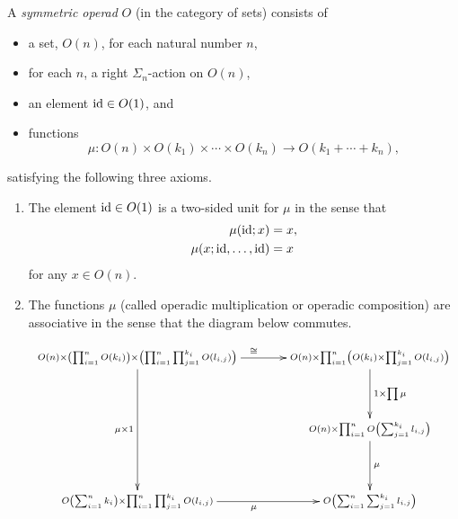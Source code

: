 \begin{Defi}
A \textit{symmetric operad} $O$ (in the category of sets) consists of
\begin{itemize}
\item a set, $O(n)$, for each natural number $n$,
\item for each $n$, a right $\Sigma_{n}$-action on $O(n)$,
\item an element $\textrm{id} \in O(1)$, and
\item functions
  \[
    \mu \colon  O(n) \times O(k_{1}) \times \cdots \times O(k_{n}) \rightarrow O(k_{1} + \cdots + k_{n}),
  \]
\end{itemize}
satisfying the following three axioms.
\begin{enumerate}
\item The element $\textrm{id} \in O(1)$ is a two-sided unit for $\mu$ in the sense that
  \begin{align*}
    \mu(\textrm{id};x) &= x,\\
    \mu(x;\textrm{id},\ldots,\textrm{id}) &= x
  \end{align*}
for any $x \in O(n)$.
\item The functions $\mu$ (called operadic multiplication or operadic composition) are associative in the sense that the diagram below commutes.


  \[
    \xy
      (0,0)*+{\scriptstyle O(n) \times \left(\prod_{i=1}^n O(k_i)\right) \times \left(\prod_{i=1}^n\prod_{j=1}^{k_i} O(l_{i,j})\right)}="a";
      (65,0)*+{\scriptstyle O(n) \times \prod_{i=1}^n \left(O(k_i) \times \prod_{j=1}^{k_i} O(l_{i,j})\right)}="b";
      (65,-20)*+{\scriptstyle O(n) \times \prod_{i=1}^n O\left(\sum_{j=1}^{k_i} l_{i,j}\right)}="c";
      (65,-40)*+{\scriptstyle O\left(\sum_{i=1}^n \sum_{j=1}^{k_i} l_{i,j}\right)}="d";
      (0,-40)*+{\scriptstyle O\left(\sum_{i=1}^n k_i\right) \times \prod_{i=1}^n \prod_{j=1}^{k_i} O(l_{i,j})}="e";
      {\ar^{\cong} "a" ; "b"};
      {\ar^{1 \times \prod \mu} "b" ; "c"};
      {\ar^{\mu} "c" ; "d"};
      {\ar_{\mu \times 1} "a" ; "e"};
      {\ar_{\mu} "e" ; "d"};
    \endxy
  \]


\end{enumerate}
\end{Defi}
